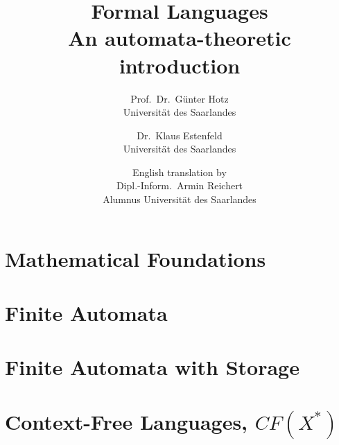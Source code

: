 \documentclass[a4paper]{amsbook}
\title{Formal Languages\\An automata-theoretic introduction}
\author{Prof.\ Dr.\ Günter Hotz\\Universität des Saarlandes
\and Dr.\ Klaus Estenfeld\\Universität des Saarlandes
\and English translation by\\Dipl.-Inform.\ Armin Reichert\\Alumnus Universität
des Saarlandes}
\begin{document}
\maketitle

\tableofcontents

\chapter{Mathematical Foundations}






\chapter{Finite Automata}








\chapter{Finite Automata with Storage}





\chapter{Context-Free Languages, $CF(X^*)$}




\nocite{*}

\end{document}
